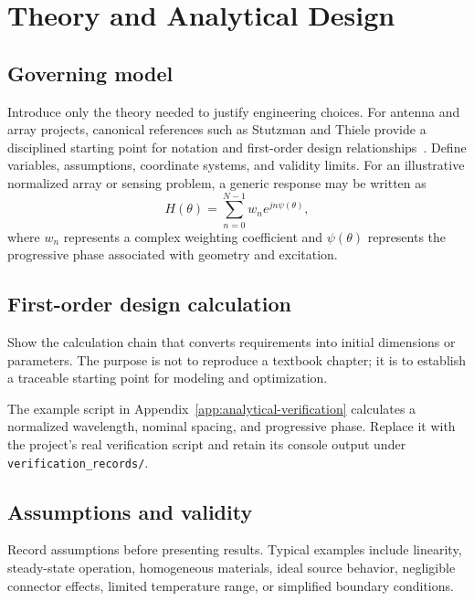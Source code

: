 \chapter{Theory and Analytical Design}

\section{Governing model}
Introduce only the theory needed to justify engineering choices. For antenna and array projects, canonical references such as Stutzman and Thiele provide a disciplined starting point for notation and first-order design relationships~\cite{stutzman2012}. Define variables,
assumptions, coordinate systems, and validity limits. For an illustrative normalized
array or sensing problem, a generic response may be written as
\begin{equation}
H(\theta)=\sum_{n=0}^{N-1} w_n e^{j n \psi(\theta)},
\label{eq:generic-response}
\end{equation}
where $w_n$ represents a complex weighting coefficient and $\psi(\theta)$ represents
the progressive phase associated with geometry and excitation.

\section{First-order design calculation}
Show the calculation chain that converts requirements into initial dimensions or
parameters. The purpose is not to reproduce a textbook chapter; it is to establish a
traceable starting point for modeling and optimization.

\begin{analyticalevidencebox}
The example script in Appendix~\ref{app:analytical-verification} calculates a normalized
wavelength, nominal spacing, and progressive phase. Replace it with the project's real
verification script and retain its console output under \texttt{verification\_records/}.
\end{analyticalevidencebox}

\section{Assumptions and validity}
Record assumptions before presenting results. Typical examples include linearity,
steady-state operation, homogeneous materials, ideal source behavior, negligible
connector effects, limited temperature range, or simplified boundary conditions.
